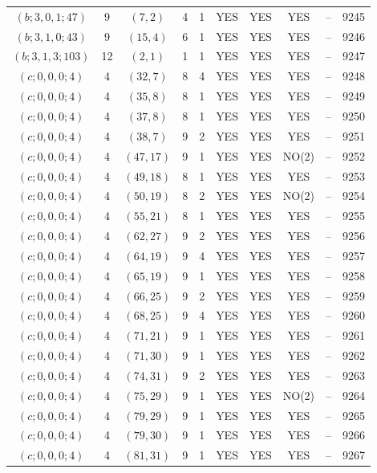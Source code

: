 \begin{longtable}{|c|c|c|c|c|c|c|c|c|c|}
$(b; 3, 0, 1; 47)$ & 9 & $(7, 2)$ & 4 & 1 & YES & YES & YES & -- & 9245\\
$(b; 3, 1, 0; 43)$ & 9 & $(15, 4)$ & 6 & 1 & YES & YES & YES & -- & 9246\\
$(b; 3, 1, 3; 103)$ & 12 & $(2, 1)$ & 1 & 1 & YES & YES & YES & -- & 9247\\
$(c; 0, 0, 0; 4)$ & 4 & $(32, 7)$ & 8 & 4 & YES & YES & YES & -- & 9248\\
$(c; 0, 0, 0; 4)$ & 4 & $(35, 8)$ & 8 & 1 & YES & YES & YES & -- & 9249\\
$(c; 0, 0, 0; 4)$ & 4 & $(37, 8)$ & 8 & 1 & YES & YES & YES & -- & 9250\\
$(c; 0, 0, 0; 4)$ & 4 & $(38, 7)$ & 9 & 2 & YES & YES & YES & -- & 9251\\
$(c; 0, 0, 0; 4)$ & 4 & $(47, 17)$ & 9 & 1 & YES & YES & NO(2) & -- & 9252\\
$(c; 0, 0, 0; 4)$ & 4 & $(49, 18)$ & 8 & 1 & YES & YES & YES & -- & 9253\\
$(c; 0, 0, 0; 4)$ & 4 & $(50, 19)$ & 8 & 2 & YES & YES & NO(2) & -- & 9254\\
$(c; 0, 0, 0; 4)$ & 4 & $(55, 21)$ & 8 & 1 & YES & YES & YES & -- & 9255\\
$(c; 0, 0, 0; 4)$ & 4 & $(62, 27)$ & 9 & 2 & YES & YES & YES & -- & 9256\\
$(c; 0, 0, 0; 4)$ & 4 & $(64, 19)$ & 9 & 4 & YES & YES & YES & -- & 9257\\
$(c; 0, 0, 0; 4)$ & 4 & $(65, 19)$ & 9 & 1 & YES & YES & YES & -- & 9258\\
$(c; 0, 0, 0; 4)$ & 4 & $(66, 25)$ & 9 & 2 & YES & YES & YES & -- & 9259\\
$(c; 0, 0, 0; 4)$ & 4 & $(68, 25)$ & 9 & 4 & YES & YES & YES & -- & 9260\\
$(c; 0, 0, 0; 4)$ & 4 & $(71, 21)$ & 9 & 1 & YES & YES & YES & -- & 9261\\
$(c; 0, 0, 0; 4)$ & 4 & $(71, 30)$ & 9 & 1 & YES & YES & YES & -- & 9262\\
$(c; 0, 0, 0; 4)$ & 4 & $(74, 31)$ & 9 & 2 & YES & YES & YES & -- & 9263\\
$(c; 0, 0, 0; 4)$ & 4 & $(75, 29)$ & 9 & 1 & YES & YES & NO(2) & -- & 9264\\
$(c; 0, 0, 0; 4)$ & 4 & $(79, 29)$ & 9 & 1 & YES & YES & YES & -- & 9265\\
$(c; 0, 0, 0; 4)$ & 4 & $(79, 30)$ & 9 & 1 & YES & YES & YES & -- & 9266\\
$(c; 0, 0, 0; 4)$ & 4 & $(81, 31)$ & 9 & 1 & YES & YES & YES & -- & 9267\\

\end{longtable}

